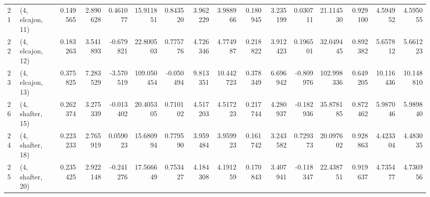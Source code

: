 \begin{tabular}{llrrrrrrrrrrrrrr}
21 &  (4, elcajon, 11) &   0.149565 &  2.890628 &  0.461077 &   15.911851 &  0.843520 &   3.962229 &   3.988966 &  0.180945 &   3.235199 &  0.030711 &   21.114530 &  0.929100 &   4.594952 &   4.595055 \\
22 &  (4, elcajon, 12) &   0.183263 &  3.541893 & -0.679821 &   22.800503 &  0.775776 &   4.726346 &   4.774987 &  0.218822 &   3.912423 &  0.196501 &   32.049445 &  0.892382 &   5.657812 &   5.661223 \\
23 &  (4, elcajon, 13) &   0.375825 &  7.283529 & -3.570519 &  109.050454 & -0.050494 &   9.813351 &  10.442723 &  0.378349 &   6.696942 & -0.809976 &  102.998336 &  0.649205 &  10.116436 &  10.148810 \\
26 &  (4, shafter, 15) &   0.262374 &  3.275339 & -0.013402 &   20.405305 &  0.710102 &   4.517203 &   4.517223 &  0.217744 &   4.280937 & -0.182936 &   35.878185 &  0.872462 &   5.987046 &   5.989840 \\
24 &  (4, shafter, 18) &   0.223233 &  2.765919 &  0.059023 &   15.680994 &  0.779590 &   3.959484 &   3.959923 &  0.161742 &   3.243582 &  0.729373 &   20.097602 &  0.928863 &   4.423304 &   4.483035 \\
25 &  (4, shafter, 20) &   0.235425 &  2.922148 & -0.241276 &   17.566649 &  0.753427 &   4.184308 &   4.191259 &  0.170843 &   3.407941 & -0.118347 &   22.438751 &  0.919637 &   4.735477 &   4.736956 \\
\bottomrule
\end{tabular}
